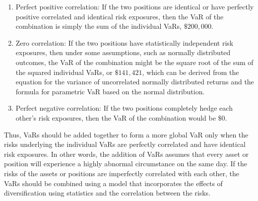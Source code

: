 \documentclass[11pt]{article}
\begin{document}
\begin{enumerate}
  \item Perfect positive correlation: If the two positions are identical or have perfectly positive correlated and identical risk exposures, then the VaR of the combination is simply the sum of the individual VaRs, $\$ 200,000$.

  \item Zero correlation: If the two positions have statistically independent risk exposures, then under some assumptions, such as normally distributed outcomes, the VaR of the combination might be the square root of the sum of the squared individual VaRs, or $\$ 141,421$, which can be derived from the equation for the variance of uncorrelated normally distributed returns and the formula for parametric VaR based on the normal distribution.

  \item Perfect negative correlation: If the two positions completely hedge each other's risk exposures, then the VaR of the combination would be $\$ 0$.

\end{enumerate}

Thus, VaRs should be added together to form a more global VaR only when the risks underlying the individual VaRs are perfectly correlated and have identical risk exposures. In other words, the addition of VaRs assumes that every asset or position will experience a highly abnormal circumstance on the same day. If the risks of the assets or positions are imperfectly correlated with each other, the VaRs should be combined using a model that incorporates the effects of diversification using statistics and the correlation between the risks.
\end{document}
